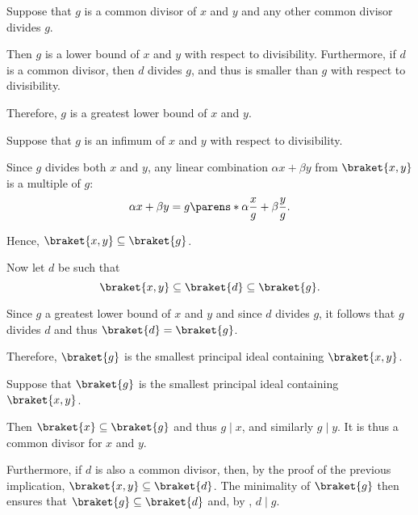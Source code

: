 \begin{defproof}
   Suppose that \( g \) is a common divisor of \( x \) and \( y \) and any other common divisor divides \( g \).

  Then \( g \) is a lower bound of \( x \) and \( y \) with respect to divisibility. Furthermore, if \( d \) is a common divisor, then \( d \) divides \( g \), and thus is smaller than \( g \) with respect to divisibility.

  Therefore, \( g \) is a greatest lower bound of \( x \) and \( y \).

   Suppose that \( g \) is an infimum of \( x \) and \( y \) with respect to divisibility.

  Since \( g \) divides both \( x \) and \( y \), any linear combination \( \alpha x + \beta y \) from \( \braket{ x, y } \) is a multiple of \( g \):
  \begin{equation*}
    \alpha x + \beta y
    =
    g \parens*{ \alpha \frac x g + \beta \frac y g }.
  \end{equation*}

  Hence, \( \braket{ x, y } \subseteq \braket{ g } \).

  Now let \( d \) be such that
  \begin{equation*}
    \braket{ x, y } \subseteq \braket{ d } \subseteq \braket{ g }.
  \end{equation*}

  Since \( g \) a greatest lower bound of \( x \) and \( y \) and since \( d \) divides \( g \), it follows that \( g \) divides \( d \) and thus \( \braket{ d } = \braket{ g } \).

  Therefore, \( \braket{ g } \) is the smallest principal ideal containing \( \braket{ x, y } \).

   Suppose that \( \braket{ g } \) is the smallest principal ideal containing \( \braket{ x, y } \).

  Then \( \braket{ x } \subseteq \braket{ g } \) and thus \( g \mid x \), and similarly \( g \mid y \). It is thus a common divisor for \( x \) and \( y \).

  Furthermore, if \( d \) is also a common divisor, then, by the proof of the previous implication, \( \braket{ x, y } \subseteq \braket{ d } \). The minimality of \( \braket{ g } \) then ensures that \( \braket{ g } \subseteq \braket{ d } \) and, by , \( d \mid g \).
\end{defproof}

